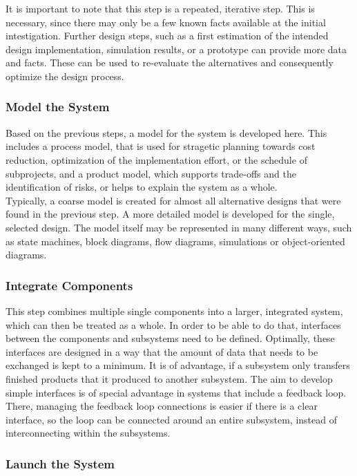 It is important to note that this step is a repeated, iterative step.
This is necessary, since there may only be a few known facts available at the initial intestigation.
Further design steps, such as a first estimation of the intended design implementation, simulation results, or a prototype can provide more data and facts.
These can be used to re-evaluate the alternatives and consequently optimize the design process.


\subsubsection{Model the System}

Based on the previous steps, a model for the system is developed here.
This includes a process model, that is used for stragetic planning towards cost reduction, optimization of the implementation effort, or the schedule of subprojects, and a product model, which supports trade-offs and the identification of risks, or helps to explain the system as a whole.\\

Typically, a coarse model is created for almost all alternative designs that were found in the previous step.
A more detailed model is developed for the single, selected design.
The model itself may be represented in many different ways, such as state machines, block diagrams, flow diagrams, simulations or object-oriented diagrams.

\subsubsection{Integrate Components}

This step combines multiple single components into a larger, integrated system, which can then be treated as a whole.
In order to be able to do that, interfaces between the components and subsystems need to be defined.
Optimally, these interfaces are designed in a way that the amount of data that needs to be exchanged is kept to a minimum.
It is of advantage, if a subsystem only transfers finished products that it produced to another subsystem.
The aim to develop simple interfaces is of special advantage in systems that include a feedback loop.
There, managing the feedback loop connections is easier if there is a clear interface, so the loop can be connected around an entire subsystem, instead of interconnecting within the subsystems.

\subsubsection{Launch the System}

